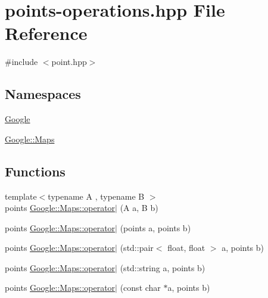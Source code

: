 \hypertarget{a00032}{}\section{points-\/operations.hpp File Reference}
\label{a00032}
{\ttfamily \#include $<$point.\+hpp$>$}\newline
\subsection*{Namespaces}
\begin{DoxyCompactItemize}
\item 
 \hyperlink{a00038}{Google}
\item 
 \hyperlink{a00039}{Google\+::\+Maps}
\end{DoxyCompactItemize}
\subsection*{Functions}
\begin{DoxyCompactItemize}
\item 
{\footnotesize template$<$typename A , typename B $>$ }\\points \hyperlink{a00039_a135e48a3de2b950a7f289e911578566e}{Google\+::\+Maps\+::operator$\vert$} (A a, B b)
\item 
points \hyperlink{a00039_a8345b75d81df9d421a75fc902fe170b2}{Google\+::\+Maps\+::operator$\vert$} (points a, points b)
\item 
points \hyperlink{a00039_a6388de3be1005526c74c57e5121dca04}{Google\+::\+Maps\+::operator$\vert$} (std\+::pair$<$ float, float $>$ a, points b)
\item 
points \hyperlink{a00039_ab85b8ad67a892be04acb06a1f0ea7d8f}{Google\+::\+Maps\+::operator$\vert$} (std\+::string a, points b)
\item 
points \hyperlink{a00039_a2e6cd6535efbd0d9a92d12744e614ed8}{Google\+::\+Maps\+::operator$\vert$} (const char $\ast$a, points b)
\end{DoxyCompactItemize}
